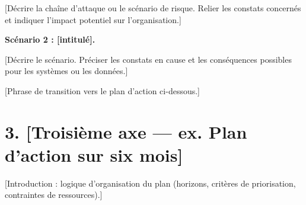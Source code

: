 \documentclass[a4paper,11pt]{article}
\begin{document}
  [Décrire la chaîne d'attaque ou le scénario de risque. Relier les constats
  concernés et indiquer l'impact potentiel sur l'organisation.]

  \textbf{Scénario 2 : [intitulé].}

  [Décrire le scénario. Préciser les constats en cause et les conséquences
  possibles pour les systèmes ou les données.]


  [Phrase de transition vers le plan d'action ci-dessous.]

  \section*{3. [Troisième axe — ex. Plan d'action sur six mois]}

  [Introduction : logique d'organisation du plan (horizons, critères de
  priorisation, contraintes de ressources).]
\end{document}
